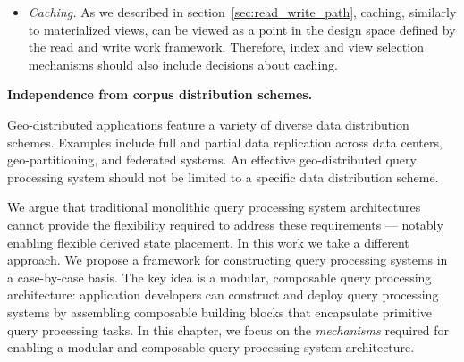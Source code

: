 \begin{itemize}
  \item \textit{Caching.}
  As we described in section~\ref{sec:read_write_path},
  caching, similarly to materialized views, can be viewed as a point in the design space defined by the read and write
  work framework.
  Therefore, index and view selection mechanisms should also include decisions about caching.

\end{itemize}

\noindent
\textbf{Independence from corpus distribution schemes.}

\noindent
Geo-distributed applications feature a variety of diverse data distribution schemes.
Examples include full and partial data replication across data centers, geo-partitioning, and federated systems.
An effective geo-distributed query processing system should not be limited to a specific data distribution scheme.

\bigskip
\noindent
We argue that traditional monolithic query processing system architectures cannot provide the flexibility required
to address these requirements --- notably enabling flexible derived state placement.
In this work we take a different approach.
We propose a framework for constructing query processing systems in a case-by-case basis.
The key idea is a modular, composable query processing architecture:
application developers can construct and deploy query processing systems by assembling composable building blocks that
encapsulate primitive query processing tasks.
In this chapter,
we focus on the \textit{mechanisms} required for enabling a modular and composable query processing system architecture.




